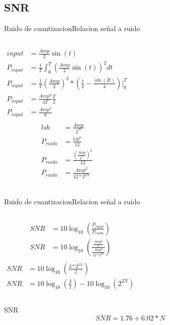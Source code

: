  \subsection{SNR}
 \begin{frame}{Ruido de cuantizacion}{Relacion señal a ruido}
    \begin{columns}[onlytextwidth]
       \begin{align*}
          input&=\frac{Amp}{2}\sin(t) \\
          P_{input} &= \frac{1}{T} \int^T_0 \left(\frac{Amp}{2}\sin(t)\right)^2 dt \\
          P_{input} &= \frac{1}{T} \left(\frac{Amp}{2}\right)^2* \left( \frac{t}{2}-\frac{\sin(2t)}{4}\right)\Big\rvert^T_0 \\
          P_{input} &= \frac{Amp^2}{4T} \frac{T}{2}\\
          P_{input} &= \frac{Amp^2}{8} \\
       \end{align*}
       \begin{align*}
          lsb       &= \frac{Amp}{2^N} \\
          P_{ruido} &= \frac{lsb^2}{12}\\
          P_{ruido} &= \frac{\left(\frac{Amp}{2^N}\right)^2}{12}\\
          P_{ruido} &= \frac{Amp^2}{12*2^{2N}}\\
       \end{align*}
    \end{columns}
    \vfill
 \end{frame}
 \begin{frame}{Ruido de cuantizacion}{Relacion señal a ruido}
    \begin{columns}[onlytextwidth]
       \begin{align*}
          SNR&=10 \log_{10} \left(\frac{P_{input}}{P_{ruido}} \right)\\
          SNR&=10 \log_{10}\left(\frac{\frac{Amp^2}{8}}{\frac{Amp^2}{12*2^{2N}}} \right) \\
       \end{align*}
       \begin{align*}
          SNR&=10 \log_{10}\left(\frac{3*2^{2N}}{2} \right)\\
          SNR&=10\log_{10}\left(\frac{3}{2}\right)-10\log_{10}\left(2^{2N}\right)
       \end{align*}
    \end{columns}
    \begin{block}{SNR}
       \begin{equation}
          SNR = 1.76 + 6.02 * N
       \end{equation}
    \end{block}
    \begin{centering}
        \\
        \\
    \end{centering}
 \end{frame}
